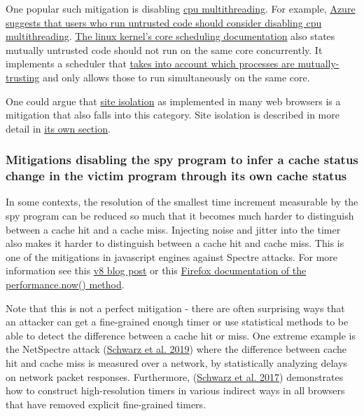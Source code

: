 \documentclass[
  a4paper,
]{report}
\begin{document}
One popular such mitigation is disabling
\href{https://en.wikipedia.org/wiki/Multithreading_(computer_architecture)}{cpu
multithreading}. For example,
\href{https://learn.microsoft.com/en-us/azure/virtual-machines/mitigate-se}{Azure
suggests that users who run untrusted code should consider disabling cpu
multithreading}.
\href{https://www.kernel.org/doc/Documentation/admin-guide/hw-vuln/core-scheduling.rst}{The
linux kernel's core scheduling documentation} also states mutually
untrusted code should not run on the same core concurrently. It
implements a scheduler that
\href{https://lwn.net/Articles/861251/}{takes into account which
processes are mutually-trusting} and only allows those to run
simultaneously on the same core.

One could argue that
\href{https://developer.chrome.com/blog/site-isolation/}{site
isolation} as implemented in many web browsers is a mitigation that also
falls into this category. Site isolation is described in more detail in
\protect\hyperlink{site-isolation}{its own section}.

\hypertarget{mitigations-disabling-the-spy-program-to-infer-a-cache-status-change-in-the-victim-program-through-its-own-cache-status}{%
\subsubsection{Mitigations disabling the spy program to infer a cache
status change in the victim program through its own cache
status}\label{mitigations-disabling-the-spy-program-to-infer-a-cache-status-change-in-the-victim-program-through-its-own-cache-status}}

In some contexts, the resolution of the smallest time increment
measurable by the spy program can be reduced so much that it becomes
much harder to distinguish between a cache hit and a cache miss.
Injecting noise and jitter into the timer also makes it harder to
distinguish between a cache hit and cache miss. This is one of the
mitigations in javascript engines against Spectre attacks. For more
information see this \href{https://v8.dev/blog/spectre}{v8 blog post} or
this
\href{https://developer.mozilla.org/en-US/docs/Web/API/Performance/now}{Firefox
documentation of the performance.now() method}.

Note that this is not a perfect mitigation - there are often surprising
ways that an attacker can get a fine-grained enough timer or use
statistical methods to be able to detect the difference between a cache
hit or miss. One extreme example is the NetSpectre
attack (\protect\hyperlink{ref-Schwarz2019}{Schwarz et al. 2019}) where
the difference between cache hit and cache miss is measured over a
network, by statistically analyzing delays on network packet responses.
Furthermore, (\protect\hyperlink{ref-Schwarz2017}{Schwarz et al. 2017})
demonstrates how to construct high-resolution timers in various indirect
ways in all browsers that have removed explicit fine-grained timers.
\end{document}
